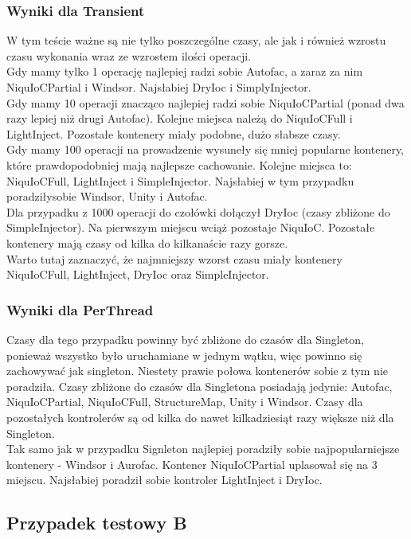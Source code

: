 \documentclass[12pt]{article}
\begin{document}
\subsubsection{Wyniki dla Transient}
W tym teście ważne są nie tylko poszczególne czasy, ale jak i również wzrostu czasu wykonania wraz ze wzrostem ilości operacji.\\
Gdy mamy tylko 1 operację najlepiej radzi sobie Autofac, a zaraz za nim NiquIoCPartial i Windsor. Najsłabiej DryIoc i SimplyInjector.\\
Gdy mamy 10 operacji znacząco najlepiej radzi sobie NiquIoCPartial (ponad dwa razy lepiej niż drugi Autofac). Kolejne miejsca należą do NiquIoCFull i LightInject. Pozostałe kontenery miały podobne, dużo słabsze czasy.\\
Gdy mamy 100 operacji na prowadzenie wysuneły się mniej popularne kontenery, które prawdopodobniej mają najlepsze cachowanie. Kolejne miejsca to: NiquIoCFull, LightInject i SimpleInjector. Najsłabiej w tym przypadku poradziłysobie Windsor, Unity i Autofac.\\
Dla przypadku z 1000 operacji do czołówki dołączył DryIoc (czasy zbliżone do SimpleInjector). Na pierwszym miejscu wciąż pozostaje NiquIoC. Pozostałe kontenery mają czasy od kilka do kilkanaście razy gorsze.\\
Warto tutaj zaznaczyć, że najmniejszy wzorst czasu miały kontenery NiquIoCFull, LightInject, DryIoc oraz SimpleInjector.

\subsubsection{Wyniki dla PerThread}
Czasy dla tego przypadku powinny być zbliżone do czasów dla Singleton, ponieważ wszystko było uruchamiane w jednym wątku, więc powinno się zachowywać jak singleton. Niestety prawie połowa kontenerów sobie z tym nie poradziła. Czasy zbliżone do czasów dla Singletona posiadają jedynie: Autofac, NiquIoCPartial, NiquIoCFull, StructureMap, Unity i Windsor. Czasy dla pozostałych kontrolerów są od kilka do nawet kilkadziesiąt razy większe niż dla Singleton.\\
Tak samo jak w przypadku Signleton najlepiej poradziły sobie najpopularniejsze kontenery - Windsor i Aurofac. Kontener NiquIoCPartial uplasował się na 3 miejscu. Najsłabiej poradził sobie kontroler LightInject i DryIoc.


\subsection{Przypadek testowy B}
\end{document}
